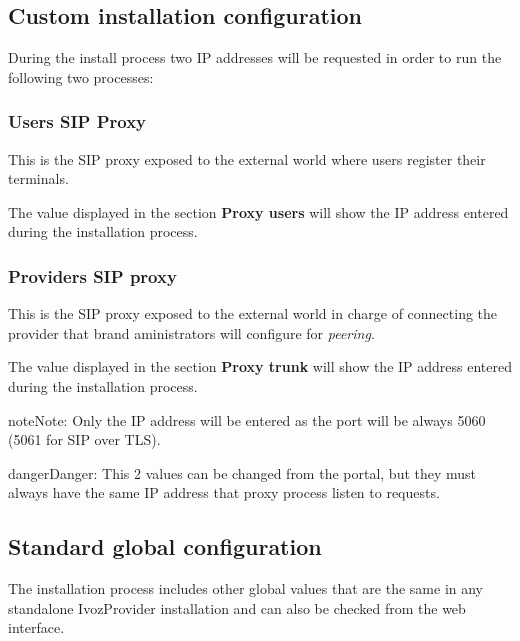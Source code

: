 \documentclass[letterpaper,10pt,english]{sphinxmanual}
\begin{document}


\subsection{Custom installation configuration}
\label{internal_calls/god_portal:custom-installation-configuration}
During the install process two IP addresses will be requested in order to run
the following two processes:


\subsubsection{Users SIP Proxy}
\label{internal_calls/god_portal:proxyusers}\label{internal_calls/god_portal:users-sip-proxy}
This is the SIP proxy exposed to the external world where users register their
terminals.

The value displayed in the section \textbf{Proxy users} will show the IP address
entered during the installation process.

\noindent{}


\subsubsection{Providers SIP proxy}
\label{internal_calls/god_portal:providers-sip-proxy}
This is the SIP proxy exposed to the external world in charge of connecting
the provider that brand aministrators will configure for \emph{peering}.

The value displayed in the section \textbf{Proxy trunk} will show the IP address
entered during the installation process.

\noindent{}

\begin{notice}{note}{Note:}
Only the IP address will be entered as the port will be always 5060
(5061 for SIP over TLS).
\end{notice}

\begin{notice}{danger}{Danger:}
This 2 values can be changed from the portal, but they must always
have the same IP address that proxy process listen to requests.
\end{notice}


\subsection{Standard global configuration}
\label{internal_calls/god_portal:standard-global-configuration}
The installation process includes other global values that are the same in
any standalone IvozProvider installation and can also be checked from the
web interface.
\end{document}

